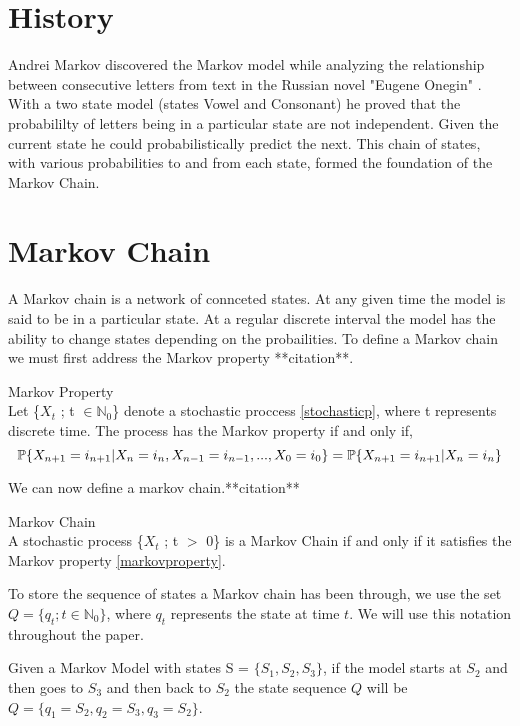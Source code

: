 \section{History}
Andrei Markov discovered the Markov model while analyzing the relationship between consecutive letters from text in the Russian novel "Eugene Onegin" . With a two state model (states Vowel and Consonant) he proved that the probabililty of letters being in a particular state are not independent. Given the current state he could probabilistically predict the next. This chain of states, with various probabilities to and from each state, formed the foundation of the Markov Chain.

\section{Markov Chain}
A Markov chain is a network of connceted states. At any given time the model is said to be in a particular state. At a regular discrete interval the model has the ability to change states depending on the probailities. To define a Markov chain we must first address the Markov property **citation**.

\begin{definition}
\label{markovproperty}
	Markov Property \\
	Let \{$X_t$ ; t $\in \mathbb{N}_0$\} denote a stochastic proccess \ref{stochasticp}, where t represents discrete time. The process has the Markov property if and only if,
	\begin{equation}
		\mathbb{P} \{X_{n+1} = i_{n+1} | X_n = i_n, X_{n-1} = i_{n-1},...,X_0 = i_0\} = \mathbb{P} \{X_{n+1} = i_{n+1} | X_n = i_n\}
	\end{equation}
\end{definition}


We can now define a markov chain.**citation**

\begin{definition}
\label{markovchain}
	Markov Chain \\
	A stochastic process \{$X_t$ ; t $>$ 0\} is a Markov Chain if and only if it satisfies the Markov property \ref{markovproperty}.
\end{definition}

To store the sequence of states a Markov chain has been through, we use the set $Q = \{q_t ; t \in \mathbb{N}_0\}$, where $q_t$ represents the state at time $t$. We will use this notation throughout the paper.

\begin{example}
	\label{stateseq}
	Given a Markov Model with states S = $\{S_1,S_2,S_3\}$, if the model starts at $S_2$ and then goes to $S_3$ and then back to $S_2$ the state sequence $Q$ will be $Q = \{q_1 = S_2, q_2 = S_3, q_3 = S_2\}$.
\end{example}


